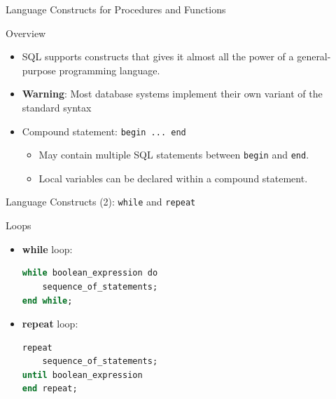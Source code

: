 \documentclass[aspectratio=169, xcolor=dvipsnames]{beamer}
\begin{document}
\begin{frame}{Language Constructs for Procedures and Functions}
    \begin{block}{Overview}
        \begin{itemize}[<+->]
            \item SQL supports constructs that gives it almost all the power of a general-purpose programming language.
            \item \textbf{Warning}: Most database systems implement their own variant of the standard syntax
            \item Compound statement: \texttt{begin ... end}
            \begin{itemize}
                \item[$\triangleright$] May contain multiple SQL statements between \texttt{begin} and \texttt{end}.
                \item[$\triangleright$] Local variables can be declared within a compound statement.
            \end{itemize}
        \end{itemize}
    \end{block}
\end{frame}

\begin{frame}[fragile]{Language Constructs (2): \texttt{while} and \texttt{repeat}}
    \begin{block}{Loops}
        \begin{itemize}[<+->]
            \item \textbf{while} loop:
            \begin{lstlisting}[language=SQL]
while boolean_expression do 
    sequence_of_statements;
end while;
            \end{lstlisting}
            
            \item \textbf{repeat} loop:
            \begin{lstlisting}[language=SQL]
repeat 
    sequence_of_statements; 
until boolean_expression 
end repeat;
            \end{lstlisting}
        \end{itemize}
    \end{block}
\end{frame}
\end{document}
